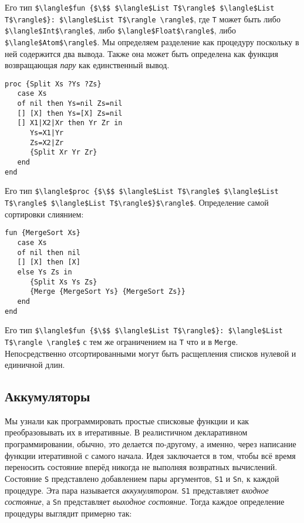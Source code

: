 Его тип \lstinline!$\langle$fun {$\$$ $\langle$List T$\rangle$ $\langle$List T$\rangle$}: $\langle$List T$\rangle \rangle$!, где \lstinline!T! может быть либо \lstinline!$\langle$Int$\rangle$!, либо \lstinline!$\langle$Float$\rangle$!, либо \lstinline!$\langle$Atom$\rangle$!. Мы определяем разделение как процедуру поскольку в ней содержится два вывода. Также она может быть определена как функция возвращающая \emph{пару} как единственный вывод.

\begin{lstlisting}
proc {Split Xs ?Ys ?Zs}
   case Xs
   of nil then Ys=nil Zs=nil
   [] [X] then Ys=[X] Zs=nil
   [] X1|X2|Xr then Yr Zr in
      Ys=X1|Yr
      Zs=X2|Zr
      {Split Xr Yr Zr}
   end
end
\end{lstlisting}

Его тип \lstinline!$\langle$proc {$\$$ $\langle$List T$\rangle$ $\langle$List T$\rangle$ $\langle$List T$\rangle$}$\rangle$!. Определение самой сортировки слиянием:

\begin{lstlisting}
fun {MergeSort Xs}
   case Xs
   of nil then nil
   [] [X] then [X]
   else Ys Zs in
      {Split Xs Ys Zs}
      {Merge {MergeSort Ys} {MergeSort Zs}}
   end
end
\end{lstlisting}

Его тип \lstinline!$\langle$fun {$\$$ $\langle$List T$\rangle$}: $\langle$List T$\rangle \rangle$! с тем же ограничением на \lstinline!T! что и в \lstinline!Merge!. Непосредственно отсортированными могут быть расщепления списков нулевой и единичной длин.

\subsection{Аккумуляторы}

Мы узнали как программировать простые списковые функции и как преобразовывать их в итеративные. В реалистичном декларативном программировании, обычно, это делается по-другому, а именно, через написание функции итеративной с самого начала. Идея заключается в том, чтобы всё время переносить состояние вперёд никогда не выполняя возвратных вычислений. Состояние \lstinline!S! представлено добавлением пары аргументов, \lstinline!S1! и \lstinline!Sn!, к каждой процедуре. Эта пара называется \emph{аккумулятором}. \lstinline!S1! представляет \emph{входное состояние}, а \lstinline!Sn! представляет \emph{выходное состояние}. Тогда каждое определение процедуры выглядит примерно так:

